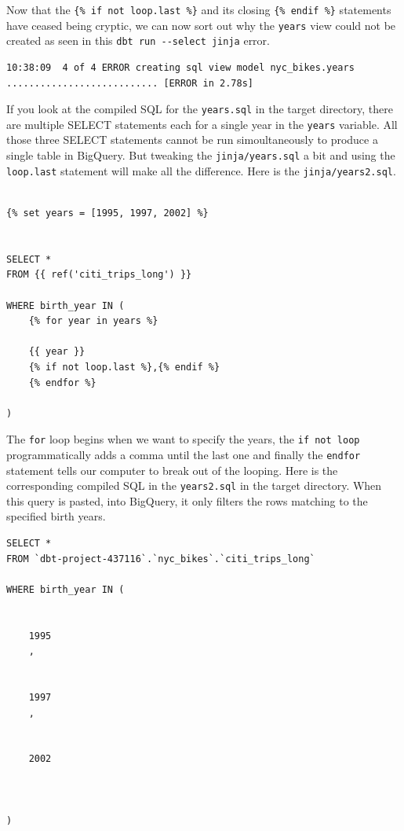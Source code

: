 \documentclass[
]{book}
\begin{document}
Now that the \texttt{\{\%\ if\ not\ loop.last\ \%\}} and its closing \texttt{\{\%\ endif\ \%\}} statements have ceased being cryptic, we can now sort out why the \texttt{years} view could not be created as seen in this \texttt{dbt\ run\ -\/-select\ jinja} error.

\begin{verbatim}
10:38:09  4 of 4 ERROR creating sql view model nyc_bikes.years ........................... [ERROR in 2.78s]
\end{verbatim}

If you look at the compiled SQL for the \texttt{years.sql} in the target directory, there are multiple SELECT statements each for a single year in the \texttt{years} variable. All those three SELECT statements cannot be run simoultaneously to produce a single table in BigQuery. But tweaking the \texttt{jinja/years.sql} a bit and using the \texttt{loop.last} statement will make all the difference. Here is the \texttt{jinja/years2.sql}.

\begin{verbatim}

{% set years = [1995, 1997, 2002] %}


SELECT * 
FROM {{ ref('citi_trips_long') }}

WHERE birth_year IN (
    {% for year in years %}
    
    {{ year }}
    {% if not loop.last %},{% endif %}
    {% endfor %}

)
\end{verbatim}

The \texttt{for} loop begins when we want to specify the years, the \texttt{if\ not\ loop} programmatically adds a comma until the last one and finally the \texttt{endfor} statement tells our computer to break out of the looping. Here is the corresponding compiled SQL in the \texttt{years2.sql} in the target directory. When this query is pasted, into BigQuery, it only filters the rows matching to the specified birth years.

\begin{verbatim}
SELECT * 
FROM `dbt-project-437116`.`nyc_bikes`.`citi_trips_long`

WHERE birth_year IN (
    
    
    1995
    ,
    
    
    1997
    ,
    
    
    2002
    
    

)
\end{verbatim}
\end{document}
